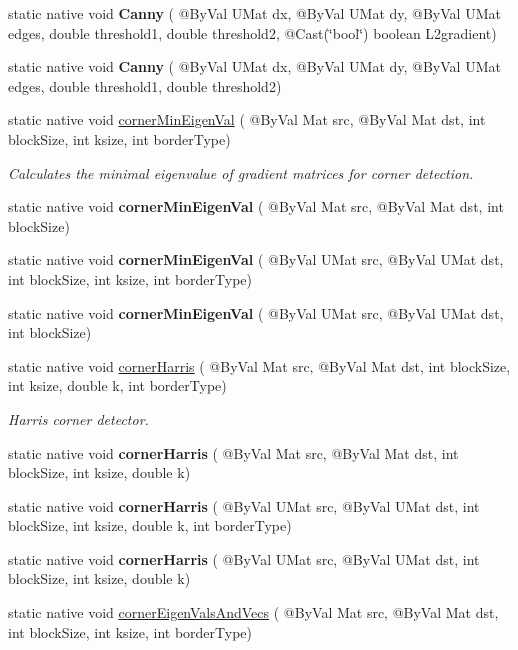 \begin{DoxyCompactItemize}
\item 
static native void {\bfseries Canny} ( @By\+Val U\+Mat dx, @By\+Val U\+Mat dy, @By\+Val U\+Mat edges, double threshold1, double threshold2, @Cast(\char`\"{}bool\char`\"{}) boolean L2gradient)
\item 
static native void {\bfseries Canny} ( @By\+Val U\+Mat dx, @By\+Val U\+Mat dy, @By\+Val U\+Mat edges, double threshold1, double threshold2)
\item 
static native void \hyperlink{group__imgproc__feature_gac03777715e9e2aa616d310aa504b86c1}{corner\+Min\+Eigen\+Val} ( @By\+Val Mat src, @By\+Val Mat dst, int block\+Size, int ksize, int border\+Type)
\begin{DoxyCompactList}\small\item\em Calculates the minimal eigenvalue of gradient matrices for corner detection. \end{DoxyCompactList}\item 
static native void {\bfseries corner\+Min\+Eigen\+Val} ( @By\+Val Mat src, @By\+Val Mat dst, int block\+Size)
\item 
static native void {\bfseries corner\+Min\+Eigen\+Val} ( @By\+Val U\+Mat src, @By\+Val U\+Mat dst, int block\+Size, int ksize, int border\+Type)
\item 
static native void {\bfseries corner\+Min\+Eigen\+Val} ( @By\+Val U\+Mat src, @By\+Val U\+Mat dst, int block\+Size)
\item 
static native void \hyperlink{group__imgproc__feature_ga33bee1c8b89d7d1963fe5212170ab77b}{corner\+Harris} ( @By\+Val Mat src, @By\+Val Mat dst, int block\+Size, int ksize, double k, int border\+Type)
\begin{DoxyCompactList}\small\item\em Harris corner detector. \end{DoxyCompactList}\item 
static native void {\bfseries corner\+Harris} ( @By\+Val Mat src, @By\+Val Mat dst, int block\+Size, int ksize, double k)
\item 
static native void {\bfseries corner\+Harris} ( @By\+Val U\+Mat src, @By\+Val U\+Mat dst, int block\+Size, int ksize, double k, int border\+Type)
\item 
static native void {\bfseries corner\+Harris} ( @By\+Val U\+Mat src, @By\+Val U\+Mat dst, int block\+Size, int ksize, double k)
\item 
static native void \hyperlink{group__imgproc__feature_gaf0aa40bf8a841f8e468c41bb2d2583b4}{corner\+Eigen\+Vals\+And\+Vecs} ( @By\+Val Mat src, @By\+Val Mat dst, int block\+Size, int ksize, int border\+Type)

\end{DoxyCompactItemize}
